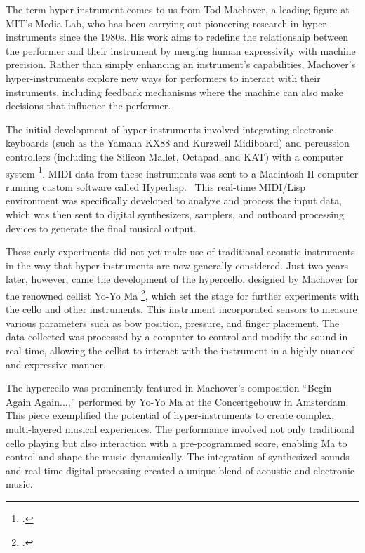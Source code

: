 \documentclass[12pt,twoside,maitrise]{dms_ks}
\theoremstyle{definition}
\begin{document}
{The term hyper-instrument comes to us from Tod Machover, a leading figure at MIT's Media Lab, who has been carrying out pioneering research in hyper-instruments since the 1980s. 
His work aims to redefine the relationship between the performer and their instrument by merging human expressivity with machine precision. 
Rather than simply enhancing an instrument's capabilities, Machover's hyper-instruments explore new ways for performers to interact with their instruments, including feedback mechanisms where the machine can also make decisions that influence the performer.

The initial development of hyper-instruments involved integrating electronic keyboards (such as the Yamaha KX88 and Kurzweil Midiboard) and percussion controllers (including the Silicon Mallet, Octapad, and KAT) with a computer system \footcite{machover_hyper-instruments_1989}. 
MIDI data from these instruments was sent to a Macintosh II computer running custom software called Hyperlisp.~
This real-time MIDI/Lisp environment was specifically developed to analyze and process the input data, which was then sent to digital synthesizers, samplers, and outboard processing devices to generate the final musical output.

These early experiments did not yet make use of traditional acoustic instruments in the way that hyper-instruments are now generally considered. Just two years later, however, came the development of the hypercello, designed by Machover for the renowned cellist Yo-Yo Ma \footcite{levenson_taming_1994}, which set the stage for further experiments with the cello and other instruments. 
This instrument incorporated sensors to measure various parameters such as bow position, pressure, and finger placement. 
The data collected was processed by a computer to control and modify the sound in real-time, allowing the cellist to interact with the instrument in a highly nuanced and expressive manner.

The hypercello was prominently featured in Machover's composition “Begin Again Again...,” performed by Yo-Yo Ma at the Concertgebouw in Amsterdam. 
This piece exemplified the potential of hyper-instruments to create complex, multi-layered musical experiences. 
The performance involved not only traditional cello playing but also interaction with a pre-programmed score, enabling Ma to control and shape the music dynamically. 
The integration of synthesized sounds and real-time digital processing created a unique blend of acoustic and electronic music.

}
\end{document}

